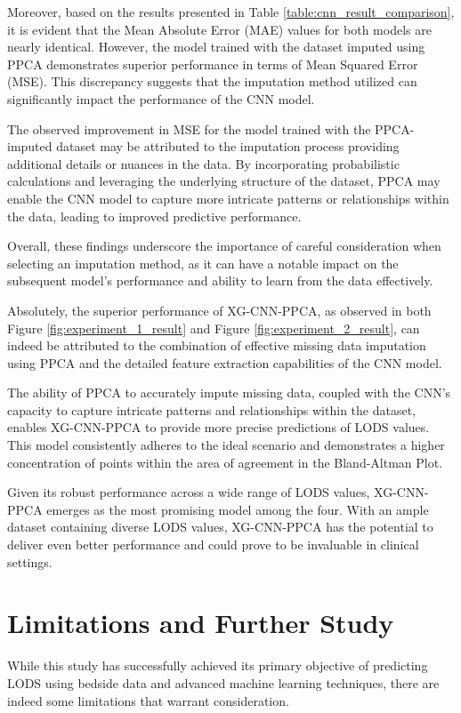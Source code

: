 \documentclass[12pt,a4paper,english
]{tunithesis}
\begin{document}
Moreover, based on the results presented in Table \ref{table:cnn_result_comparison}, it is evident that the Mean Absolute Error (MAE) values for both models are nearly identical. However, the model trained with the dataset imputed using PPCA demonstrates superior performance in terms of Mean Squared Error (MSE). This discrepancy suggests that the imputation method utilized can significantly impact the performance of the CNN model.

The observed improvement in MSE for the model trained with the PPCA-imputed dataset may be attributed to the imputation process providing additional details or nuances in the data. By incorporating probabilistic calculations and leveraging the underlying structure of the dataset, PPCA may enable the CNN model to capture more intricate patterns or relationships within the data, leading to improved predictive performance.

Overall, these findings underscore the importance of careful consideration when selecting an imputation method, as it can have a notable impact on the subsequent model's performance and ability to learn from the data effectively.

Absolutely, the superior performance of XG-CNN-PPCA, as observed in both Figure \ref{fig:experiment_1_result} and Figure \ref{fig:experiment_2_result}, can indeed be attributed to the combination of effective missing data imputation using PPCA and the detailed feature extraction capabilities of the CNN model.

The ability of PPCA to accurately impute missing data, coupled with the CNN's capacity to capture intricate patterns and relationships within the dataset, enables XG-CNN-PPCA to provide more precise predictions of LODS values. This model consistently adheres to the ideal scenario and demonstrates a higher concentration of points within the area of agreement in the Bland-Altman Plot.

Given its robust performance across a wide range of LODS values, XG-CNN-PPCA emerges as the most promising model among the four. With an ample dataset containing diverse LODS values, XG-CNN-PPCA has the potential to deliver even better performance and could prove to be invaluable in clinical settings.

\section{Limitations and Further Study}
While this study has successfully achieved its primary objective of predicting LODS using bedside data and advanced machine learning techniques, there are indeed some limitations that warrant consideration.
\end{document}
